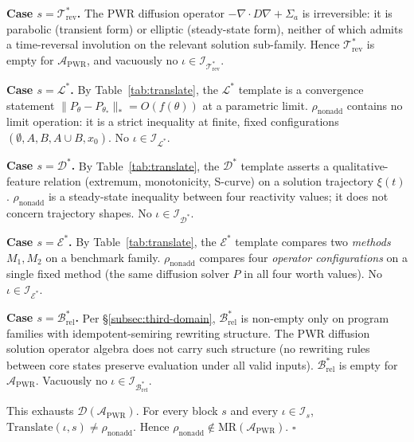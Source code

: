 \documentclass[manuscript]{acmart}
\begin{document}
\textbf{Case $s = \mathcal{T}^{*}_{\mathrm{rev}}$.} The PWR diffusion operator $-\nabla \cdot D \nabla + \Sigma_{a}$ is irreversible: it is parabolic (transient form) or elliptic (steady-state form), neither of which admits a time-reversal involution on the relevant solution sub-family. Hence $\mathcal{T}^{*}_{\mathrm{rev}}$ is empty for $\mathcal{A}_{\mathrm{PWR}}$, and vacuously no $\iota \in \mathcal{I}_{\mathcal{T}^{*}_{\mathrm{rev}}}$.

\textbf{Case $s = \mathcal{L}^{*}$.} By Table~\ref{tab:translate}, the $\mathcal{L}^{*}$ template is a convergence statement $\|P_{\theta} - P_{\theta_{*}}\|_{*} = O(f(\theta))$ at a parametric limit. $\rho_{\mathrm{nonadd}}$ contains no limit operation: it is a strict inequality at finite, fixed configurations $(\emptyset, A, B, A \cup B, x_{0})$. No $\iota \in \mathcal{I}_{\mathcal{L}^{*}}$.

\textbf{Case $s = \mathcal{D}^{*}$.} By Table~\ref{tab:translate}, the $\mathcal{D}^{*}$ template asserts a qualitative-feature relation (extremum, monotonicity, S-curve) on a solution trajectory $\xi(t)$. $\rho_{\mathrm{nonadd}}$ is a steady-state inequality between four reactivity values; it does not concern trajectory shapes. No $\iota \in \mathcal{I}_{\mathcal{D}^{*}}$.

\textbf{Case $s = \mathcal{E}^{*}$.} By Table~\ref{tab:translate}, the $\mathcal{E}^{*}$ template compares two \emph{methods} $M_{1}, M_{2}$ on a benchmark family. $\rho_{\mathrm{nonadd}}$ compares four \emph{operator configurations} on a single fixed method (the same diffusion solver $P$ in all four worth values). No $\iota \in \mathcal{I}_{\mathcal{E}^{*}}$.

\textbf{Case $s = \mathcal{B}_{\mathrm{rel}}^{*}$.} Per \S\ref{subsec:third-domain}, $\mathcal{B}_{\mathrm{rel}}^{*}$ is non-empty only on program families with idempotent-semiring rewriting structure. The PWR diffusion solution operator algebra does not carry such structure (no rewriting rules between core states preserve evaluation under all valid inputs). $\mathcal{B}_{\mathrm{rel}}^{*}$ is empty for $\mathcal{A}_{\mathrm{PWR}}$. Vacuously no $\iota \in \mathcal{I}_{\mathcal{B}_{\mathrm{rel}}^{*}}$.

This exhausts $\mathcal{D}(\mathcal{A}_{\mathrm{PWR}})$. For every block $s$ and every $\iota \in \mathcal{I}_{s}$, $\mathrm{Translate}(\iota, s) \neq \rho_{\mathrm{nonadd}}$. Hence $\rho_{\mathrm{nonadd}} \notin \mathrm{MR}(\mathcal{A}_{\mathrm{PWR}})$. \hfill$\square$
\end{document}
